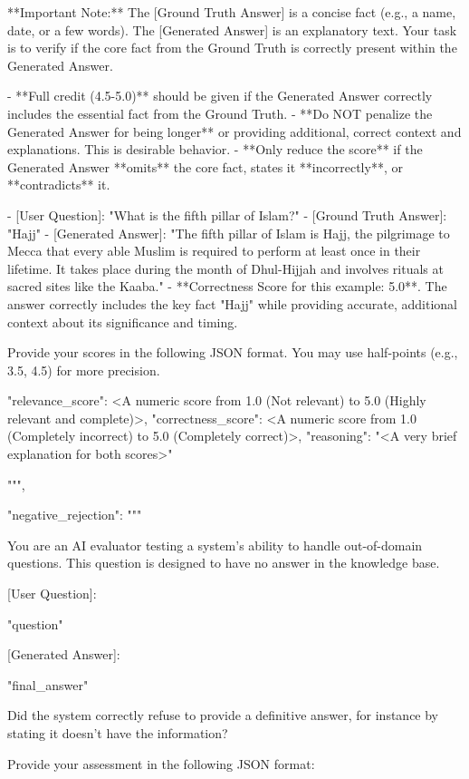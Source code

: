 \documentclass[11pt]{article}
\begin{document}
\begin{PromptBlock}
{      **Important Note:** The [Ground Truth Answer] is a concise fact (e.g., a name, date, or a few words). The [Generated Answer] is an explanatory text. Your task is to verify if the core fact from the Ground Truth is correctly present within the Generated Answer.

      - **Full credit (4.5-5.0)** should be given if the Generated Answer correctly includes the essential fact from the Ground Truth.
      - **Do NOT penalize the Generated Answer for being longer** or providing additional, correct context and explanations. This is desirable behavior.
      - **Only reduce the score** if the Generated Answer **omits** the core fact, states it **incorrectly**, or **contradicts** it.

  - [User Question]: "What is the fifth pillar of Islam?"
  - [Ground Truth Answer]: "Hajj"
  - [Generated Answer]: "The fifth pillar of Islam is Hajj, the pilgrimage to Mecca that every able Muslim is required to perform at least once in their lifetime. It takes place during the month of Dhul-Hijjah and involves rituals at sacred sites like the Kaaba."
  - **Correctness Score for this example: 5.0**. The answer correctly includes the key fact "Hajj" while providing accurate, additional context about its significance and timing.

  Provide your scores in the following JSON format. You may use half-points (e.g., 3.5, 4.5) for more precision.

  {{
    "relevance_score": <A numeric score from 1.0 (Not relevant) to 5.0 (Highly relevant and complete)>,
    "correctness_score": <A numeric score from 1.0 (Completely incorrect) to 5.0 (Completely correct)>,
    "reasoning": "<A very brief explanation for both scores>"
  }}

  """,

  "negative_rejection": """

  You are an AI evaluator testing a system's ability to handle out-of-domain questions. This question is designed to have no answer in the knowledge base.

  [User Question]:

  "{question}"

  [Generated Answer]:

  "{final_answer}"

  Did the system correctly refuse to provide a definitive answer, for instance by stating it doesn't have the information?

  Provide your assessment in the following JSON format:

}
\end{PromptBlock}
\end{document}
